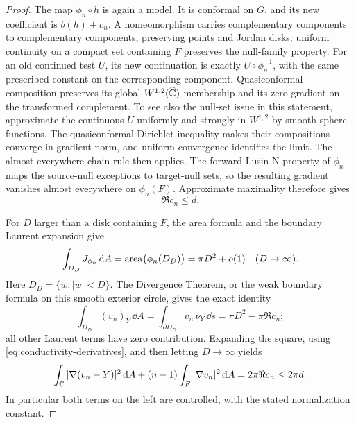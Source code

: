 \begin{proof}
The map $\phi_n\circ h$ is again a model. It is conformal on $G$, and
its new coefficient is $b(h)+c_n$. A homeomorphism carries complementary
components to complementary components, preserving points and Jordan
disks; uniform continuity on a compact set containing $F$ preserves
the null-family property. For an old continued test $U$, its new
continuation is exactly $U\circ\phi_n^{-1}$, with the same prescribed
constant on the corresponding component. Quasiconformal composition
preserves its global $W^{1,2}(\widehat{\mathbb C})$ membership and its zero gradient
on the transformed complement. To see also the null-set issue in this
statement, approximate the continuous $U$ uniformly and strongly in
$W^{1,2}$ by smooth sphere functions. The quasiconformal Dirichlet
inequality makes their compositions converge in gradient norm, and
uniform convergence identifies the limit. The almost-everywhere chain
rule then applies. The forward Lusin N property of $\phi_n$ maps the
source-null exceptions to target-null sets, so the resulting gradient
vanishes almost everywhere on $\phi_n(F)$.
Approximate maximality therefore gives
\begin{equation}\label{eq:coefficient-gain}
 \Re c_n\le d.
\end{equation}

For $D$ larger than a disk containing $F$, the area formula and the
boundary Laurent expansion give
\[
 \int_{D_D}J_{\phi_n}\,\mathrm d A
   =\operatorname{area}\bigl(\phi_n(D_D)\bigr)=\pi D^2+o(1)
       \quad(D\to\infty).
\]
Here $D_D=\{w:|w|<D\}$. The Divergence Theorem, or the weak boundary
formula on this smooth exterior circle, gives the exact identity
\[
 \int_{D_D}(v_n)_Y\,\dd A
   =\int_{\partial D_D}v_n\,\nu_Y\,\dd s
   =\pi D^2-\pi\Re c_n;
\]
all other Laurent terms have zero contribution. Expanding the square,
using \eqref{eq:conductivity-derivatives}, and then letting $D\to\infty$
yields
\begin{equation}\label{eq:conductivity-energy}
 \int_{\mathbb C}|\nabla(v_n-Y)|^2\,\mathrm d A
 +(n-1)\int_F|\nabla v_n|^2\,\mathrm d A
   =2\pi\Re c_n\le2\pi d.
\end{equation}
In particular both terms on the left are controlled, with the stated
normalization constant.


\end{proof}
